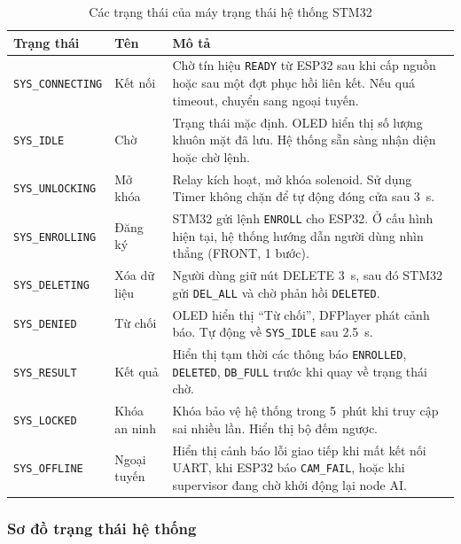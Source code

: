 \begin{table}[H]
  \centering
  \small
  \caption{Các trạng thái của máy trạng thái hệ thống STM32}
  \label{tab:fsm_states}
  \begin{tabularx}{\textwidth}{>{\ttfamily\arraybackslash}p{3.6cm} >{\raggedright\arraybackslash}p{2.0cm} Y}
    \toprule
    \textbf{Trạng thái} & \textbf{Tên} & \textbf{Mô tả} \\
    \midrule
    \texttt{SYS\_CONNECTING} & Kết nối & Chờ tín hiệu \texttt{READY} từ ESP32 sau khi cấp nguồn hoặc sau một đợt phục hồi liên kết. Nếu quá timeout, chuyển sang ngoại tuyến. \\
    \texttt{SYS\_IDLE}       & Chờ         & Trạng thái mặc định. OLED hiển thị số lượng khuôn mặt đã lưu. Hệ thống sẵn sàng nhận diện hoặc chờ lệnh. \\
    \texttt{SYS\_UNLOCKING}  & Mở khóa     & Relay kích hoạt, mở khóa solenoid. Sử dụng Timer không chặn để tự động đóng cửa sau \SI{3}{s}. \\
    \texttt{SYS\_ENROLLING}  & Đăng ký     & STM32 gửi lệnh \texttt{ENROLL} cho ESP32. Ở cấu hình hiện tại, hệ thống hướng dẫn người dùng nhìn thẳng (FRONT, 1 bước). \\
    \texttt{SYS\_DELETING}   & Xóa dữ liệu & Người dùng giữ nút DELETE \SI{3}{s}, sau đó STM32 gửi \texttt{DEL\_ALL} và chờ phản hồi \texttt{DELETED}. \\
    \texttt{SYS\_DENIED}     & Từ chối     & OLED hiển thị ``Từ chối'', DFPlayer phát cảnh báo. Tự động về \texttt{SYS\_IDLE} sau \SI{2.5}{s}. \\
    \texttt{SYS\_RESULT}     & Kết quả     & Hiển thị tạm thời các thông báo \texttt{ENROLLED}, \texttt{DELETED}, \texttt{DB\_FULL} trước khi quay về trạng thái chờ. \\
    \texttt{SYS\_LOCKED}     & Khóa an ninh & Khóa bảo vệ hệ thống trong \SI{5}{phút} khi truy cập sai nhiều lần. Hiển thị bộ đếm ngược. \\
    \texttt{SYS\_OFFLINE}    & Ngoại tuyến & Hiển thị cảnh báo lỗi giao tiếp khi mất kết nối UART, khi ESP32 báo \texttt{CAM\_FAIL}, hoặc khi supervisor đang chờ khởi động lại node AI. \\
    \bottomrule
  \end{tabularx}
\end{table}

\subsubsection{Sơ đồ trạng thái hệ thống}

